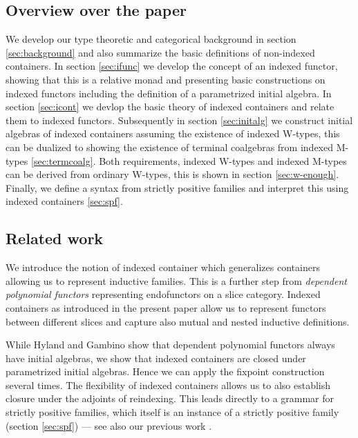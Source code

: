 \documentclass[a4paper]{article}
\begin{document}
\subsection{Overview over the paper}
\label{sec:overview-over-paper}

We develop our type theoretic and categorical background in section
\ref{sec:background} and also summarize the basic definitions of
non-indexed containers. In section \ref{sec:ifunc} we develop the
concept of an indexed functor, showing that this is a relative monad
and presenting basic constructions on indexed functors including the
definition of a parametrized initial algebra. In section
\ref{sec:icont} we devlop the basic theory of indexed containers and
relate them to indexed functors. Subsequently in section
\ref{sec:initalg} we construct initial algebras of indexed containers
assuming the existence of indexed W-types, this can be dualized to
showing the existence of terminal coalgebras from indexed M-types 
\ref{sec:termcoalg}. Both requirements, indexed W-types and indexed
M-types can be derived from ordinary W-types, this is shown in section
\ref{sec:w-enough}. Finally, we define a syntax from strictly positive
families and interpret this using indexed containers \ref{sec:spf}.

\subsection{Related work}
\label{sec:related-work}

\noindent We introduce the notion of indexed container which
generalizes containers allowing us to represent inductive
families. This is a further step from \emph{dependent polynomial
  functors} \cite{HylandGambino} representing endofunctors on a slice
category. Indexed containers as introduced in the present paper allow us
to represent functors between different slices and capture also mutual
and nested inductive definitions.

While Hyland and Gambino \cite{HylandGambino} show that dependent polynomial 
functors always
have initial algebras, we show that indexed containers are closed under 
parametrized initial algebras. Hence we can apply the fixpoint
construction several times. The flexibility of indexed
containers allows us to also establish closure under the adjoints of
reindexing. This leads directly to a grammar for strictly positive
families, which itself is an instance of a strictly positive family 
(section \ref{sec:spf}) --- see also our previous work \cite{alti:cats07,alti:jcats07}.
\end{document}
